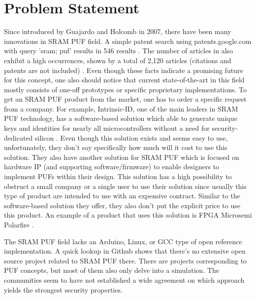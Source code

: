 \section{Problem Statement}


Since introduced by Guajardo and Holcomb in 2007, there have been many innovations in SRAM PUF field. A simple patent search using patents.google.com with query 'sram; puf' results in 546 results \cite{google_patents}. The number of articles in  also exhibit a high occurrences, shown by a total of 2,120 articles (citations and patents are not included) \cite{google_scholar}.
Even though these facts indicate a promising future for this concept, one also should notice that current state-of-the-art in this field mostly consists of one-off prototypes or specific proprietary implementations.
To get an SRAM PUF product from the market, one has to order a specific request from a company. For example, Intrinsic-ID, one of the main leaders in SRAM PUF technology, has a software-based solution which able to generate unique keys and identities for nearly all microcontrollers without a need for security-dedicated silicon \cite{broadkey}. Even though this solution exists and seems easy to use, unfortunately, they don't say specifically how much will it cost to use this solution.
They also have another solution for SRAM PUF which is focused on hardware IP (and supporting software/firmware) to enable designers to implement PUFs within their design. This solution has a high possibility to obstruct a small company or a single user to use their solution since usually this type of product are intended to use with an expensive contract. Similar to the software-based solution they offer, they also don't put the explicit price to use this product. An example of a product that uses this solution is FPGA Microsemi Polarfire \cite{polarfire}.

The SRAM PUF field lacks an Arduino, Linux, or GCC type of open reference implementation. A quick lookup in Github shows that there's no extensive open source project related to SRAM PUF there. There are projects corresponding to PUF concepts, but most of them also only delve into a simulation.
The communities seem to have not established a wide agreement on which approach yields the strongest security properties.

